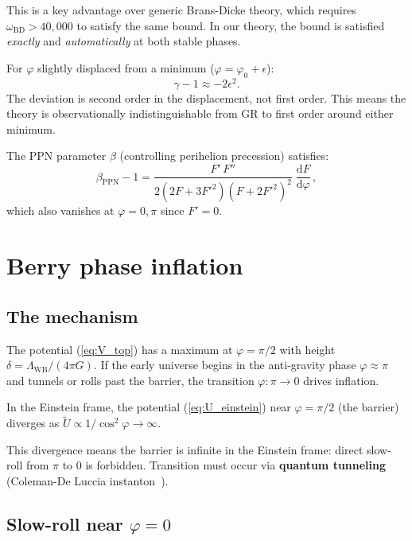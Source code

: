 \documentclass[aps,prd,twocolumn,superscriptaddress,nofootinbib]{revtex4-2}
\newcommand{\dd}{\mathrm{d}}
\newcommand{\Lw}{\Lambda_{\mathrm{WB}}}
\begin{document}
This is a key advantage over generic Brans-Dicke theory,
which requires $\omega_{\mathrm{BD}} > 40{,}000$ to satisfy
the same bound. In our theory, the bound is satisfied
\emph{exactly} and \emph{automatically} at both stable phases.

For $\varphi$ slightly displaced from a minimum
($\varphi = \varphi_0 + \epsilon$):
\begin{equation}
  \gamma - 1 \approx -2\epsilon^2.
\end{equation}
The deviation is second order in the displacement,
not first order.
This means the theory is observationally indistinguishable from GR
to first order around either minimum.

The PPN parameter $\beta$ (controlling perihelion precession)
satisfies:
\begin{equation}
  \beta_{\mathrm{PPN}} - 1
  = \frac{F'\,F''}{2(2F + 3F'^2)(F + 2F'^2)^2}\;
  \frac{\dd F}{\dd\varphi}\,,
\end{equation}
which also vanishes at $\varphi = 0, \pi$ since $F' = 0$.


\section{Berry phase inflation}
\label{sec:inflation}

\subsection{The mechanism}

The potential (\ref{eq:V_top}) has
a maximum at $\varphi = \pi/2$ with height
$\delta = \Lw/(4\pi G)$.
If the early universe begins in the anti-gravity phase
$\varphi \approx \pi$ and tunnels or rolls past the barrier,
the transition $\varphi: \pi \to 0$ drives inflation.

In the Einstein frame, the potential (\ref{eq:U_einstein})
near $\varphi = \pi/2$ (the barrier) diverges as
$\tilde{U} \propto 1/\cos^2\varphi \to \infty$.

This divergence means the barrier is infinite in the Einstein frame:
direct slow-roll from $\pi$ to $0$ is forbidden.
Transition must occur via \textbf{quantum tunneling}
(Coleman-De Luccia instanton~\cite{ColemanDeLuccia1980}).

\subsection{Slow-roll near $\varphi = 0$}
\end{document}
